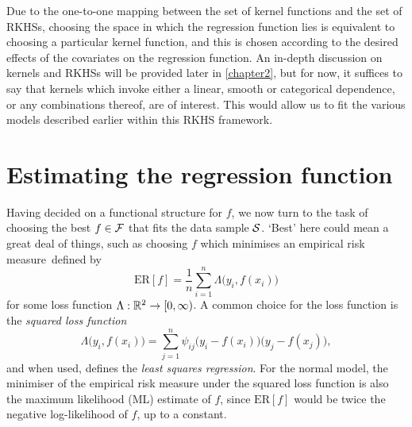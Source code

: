 \documentclass[a4paper,showframe,11pt]{report}
\begin{document}
Due to the one-to-one mapping between the set of kernel functions and the set of RKHSs, choosing the space in which the regression function lies is equivalent to choosing a particular kernel function, and this is chosen according to the desired effects of the covariates on the regression function.
An in-depth discussion on kernels and RKHSs will be provided later in \cref{chapter2}, but for now, it suffices to say that kernels which invoke either a linear, smooth or categorical dependence, or any combinations thereof, are of interest.
This would allow us to fit the various models described earlier within this RKHS framework.

\section{Estimating the regression function}

Having decided on a functional structure for $f$, we now turn to the task of choosing the best $f \in {\mathcal F}$ that fits the data sample ${\mathcal S}$.
`Best' here could mean a great deal of things, such as choosing $f$ which minimises an empirical risk measure\footnotemark~defined by
%
\[
  \text{ER}[f] = \frac{1}{n} \sum_{i=1}^n \Lambda\big( y_i, f(x_i) \big)
\]
%
for some loss function $\Lambda:\mathbb{R}^2 \to [0,\infty)$.
A common choice for the loss function is the \emph{squared loss function}
%
\[
  \Lambda\big(y_i,f(x_i)\big) = \sum_{j=1}^n \psi_{ij} \big(y_i - f(x_i)\big)\big(y_j - f(x_j)\big),
\]
%
and when used, defines the \emph{least squares regression}.
For the normal model, the minimiser of the empirical risk measure under the squared loss function is also the maximum likelihood (ML) estimate of $f$, since $\text{ER}[f]$ would be twice the negative log-likelihood of $f$, up to a constant.

\end{document}

